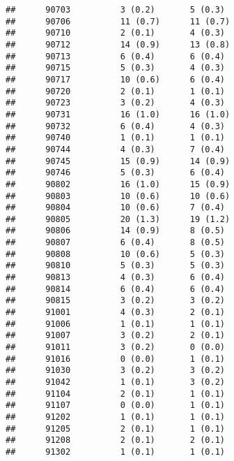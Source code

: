 \documentclass[]{article}
\begin{document}
\begin{verbatim}
##      90703          3 (0.2)       5 (0.3)                       
##      90706          11 (0.7)      11 (0.7)                      
##      90710          2 (0.1)       4 (0.3)                       
##      90712          14 (0.9)      13 (0.8)                      
##      90713          6 (0.4)       6 (0.4)                       
##      90715          5 (0.3)       4 (0.3)                       
##      90717          10 (0.6)      6 (0.4)                       
##      90720          2 (0.1)       1 (0.1)                       
##      90723          3 (0.2)       4 (0.3)                       
##      90731          16 (1.0)      16 (1.0)                      
##      90732          6 (0.4)       4 (0.3)                       
##      90740          1 (0.1)       1 (0.1)                       
##      90744          4 (0.3)       7 (0.4)                       
##      90745          15 (0.9)      14 (0.9)                      
##      90746          5 (0.3)       6 (0.4)                       
##      90802          16 (1.0)      15 (0.9)                      
##      90803          10 (0.6)      10 (0.6)                      
##      90804          10 (0.6)      7 (0.4)                       
##      90805          20 (1.3)      19 (1.2)                      
##      90806          14 (0.9)      8 (0.5)                       
##      90807          6 (0.4)       8 (0.5)                       
##      90808          10 (0.6)      5 (0.3)                       
##      90810          5 (0.3)       5 (0.3)                       
##      90813          4 (0.3)       6 (0.4)                       
##      90814          6 (0.4)       6 (0.4)                       
##      90815          3 (0.2)       3 (0.2)                       
##      91001          4 (0.3)       2 (0.1)                       
##      91006          1 (0.1)       1 (0.1)                       
##      91007          3 (0.2)       2 (0.1)                       
##      91011          3 (0.2)       0 (0.0)                       
##      91016          0 (0.0)       1 (0.1)                       
##      91030          3 (0.2)       3 (0.2)                       
##      91042          1 (0.1)       3 (0.2)                       
##      91104          2 (0.1)       1 (0.1)                       
##      91107          0 (0.0)       1 (0.1)                       
##      91202          1 (0.1)       1 (0.1)                       
##      91205          2 (0.1)       1 (0.1)                       
##      91208          2 (0.1)       2 (0.1)                       
##      91302          1 (0.1)       1 (0.1)                       

\end{verbatim}
\end{document}
